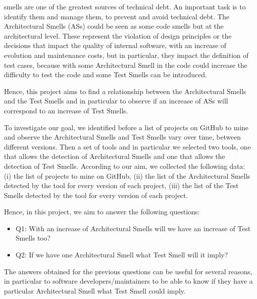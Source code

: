 
 smells are one of the greatest sources of technical debt. An important task is to identify them and manage them, to prevent and avoid technical debt. The Architectural Smells (ASs) could be seen as some code smells but at the architectural level. These represent the violation of design principles or the decisions that impact the quality of internal software, with an increase of evolution and maintenance costs, but in particular, they impact the definition of test cases, because with some Architectural Smell in the code could increase the difficulty to test the code and some Test Smells can be introduced.\par\hfill

Hence, this project aims to find a relationship between the Architectural Smells and the Test Smells and in particular to observe if an increase of ASs will correspond to an increase of Test Smells.\par\hfill

To investigate our goal, we identified before a list of projects on GitHub to mine and observe the Architectural Smells and Test Smells vary over time, between different versions. Then a set of tools and in particular we selected two tools, one that allows the detection of Architectural Smells and one that allows the detection of Test Smells.
According to our aim, we collected the following data: 
(i) the list of projects to mine on GitHub,
(ii) the list of the Architectural Smells detected by the tool for every version of each project, 
(iii) the list of the Test Smells detected by the tool for every version of each project.\par\hfill

Hence, in this project, we aim to answer the following questions:
\begin{itemize}
  \item Q1: With an increase of Architectural Smells will we have an increase of Test Smells too? 
  \item Q2: If we have one Architectural Smell what Test Smell will it imply?
\end{itemize}\par\hfill

The answers obtained for the previous questions can be useful for several reasons, in particular to software developers/maintainers to be able to know if they have a particular Architectural Smell what Test Smell could imply.\par\hfill

